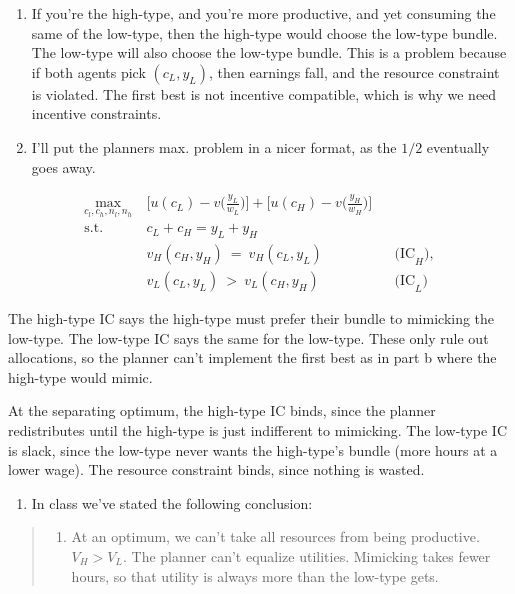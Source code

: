 \documentclass[
  letterpaper,
  DIV=11,
  numbers=noendperiod]{scrartcl}
\providecommand{\tightlist}{%
  \setlength{\itemsep}{0pt}\setlength{\parskip}{0pt}}
\begin{document}
\begin{enumerate}
\def\labelenumi{\alph{enumi}.}
\setcounter{enumi}{1}
\item
  If you're the high-type, and you're more productive, and yet consuming
  the same of the low-type, then the high-type would choose the low-type
  bundle. The low-type will also choose the low-type bundle. This is a
  problem because if both agents pick \((c_L,y_L)\), then earnings fall,
  and the resource constraint is violated. The first best is not
  incentive compatible, which is why we need incentive constraints.
\item
  I'll put the planners max. problem in a nicer format, as the \(1/2\)
  eventually goes away.
\end{enumerate}

\[
\begin{aligned}
\max_{c_l,c_h, n_l, n_h}\ & \Big[u(c_L)-v\big(\tfrac{y_L}{w_L}\big)\Big]+\Big[u(c_H)-v\big(\tfrac{y_H}{w_H}\big)\Big]\\
\text{s.t.}\ & c_L+c_H= y_L+y_H \\
& v_H(c_H, y_H)\ = \ v_H(c_L,y_L) &&\text{(IC}_H), \\
& v_L(c_L, y_L)\ > \ v_L(c_H,y_H) &&\text{(IC}_L)
\end{aligned}
\]

The high-type IC says the high-type must prefer their bundle to
mimicking the low-type. The low-type IC says the same for the low-type.
These only rule out allocations, so the planner can't implement the
first best as in part b where the high-type would mimic.

At the separating optimum, the high-type IC binds, since the planner
redistributes until the high-type is just indifferent to mimicking. The
low-type IC is slack, since the low-type never wants the high-type's
bundle (more hours at a lower wage). The resource constraint binds,
since nothing is wasted.

\begin{enumerate}
\def\labelenumi{\alph{enumi}.}
\setcounter{enumi}{3}
\tightlist
\item
  In class we've stated the following conclusion:
\end{enumerate}

\begin{quote}
\begin{enumerate}
\def\labelenumi{\arabic{enumi}.}
\tightlist
\item
  At an optimum, we can't take all resources from being productive.
  \(V_H > V_L\). The planner can't equalize utilities. Mimicking takes
  fewer hours, so that utility is always more than the low-type gets.
\end{enumerate}
\end{quote}
\end{document}
